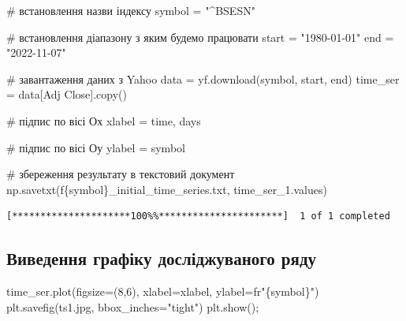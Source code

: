 \documentclass[
  letterpaper,
]{report}
\newenvironment{Shaded}{\begin{snugshade}}{\end{snugshade}}
\newcommand{\CommentTok}[1]{\textcolor[rgb]{0.37,0.37,0.37}{#1}}
\newcommand{\DecValTok}[1]{\textcolor[rgb]{0.68,0.00,0.00}{#1}}
\newcommand{\NormalTok}[1]{\textcolor[rgb]{0.00,0.23,0.31}{#1}}
\newcommand{\OperatorTok}[1]{\textcolor[rgb]{0.37,0.37,0.37}{#1}}
\newcommand{\SpecialCharTok}[1]{\textcolor[rgb]{0.37,0.37,0.37}{#1}}
\newcommand{\SpecialStringTok}[1]{\textcolor[rgb]{0.13,0.47,0.30}{#1}}
\newcommand{\StringTok}[1]{\textcolor[rgb]{0.13,0.47,0.30}{#1}}
\newcommand{\VerbatimStringTok}[1]{\textcolor[rgb]{0.13,0.47,0.30}{#1}}
\begin{document}
\begin{Shaded}
\begin{Highlighting}[]
\CommentTok{\# встановлення назви індексу}
\NormalTok{symbol }\OperatorTok{=} \StringTok{"\^{}BSESN"} 

\CommentTok{\# встановлення діапазону з яким будемо працювати}
\NormalTok{start }\OperatorTok{=} \StringTok{"1980{-}01{-}01"}
\NormalTok{end }\OperatorTok{=} \StringTok{"2022{-}11{-}07"}

\CommentTok{\# завантаження даних з Yahoo}
\NormalTok{data }\OperatorTok{=}\NormalTok{ yf.download(symbol, start, end)}
\NormalTok{time\_ser }\OperatorTok{=}\NormalTok{ data[}\StringTok{\textquotesingle{}Adj Close\textquotesingle{}}\NormalTok{].copy()}

\CommentTok{\# підпис по вісі Ох }
\NormalTok{xlabel }\OperatorTok{=} \StringTok{\textquotesingle{}time, days\textquotesingle{}}

\CommentTok{\# підпис по вісі Оу}
\NormalTok{ylabel }\OperatorTok{=}\NormalTok{ symbol                       }

\CommentTok{\# збереження результату в текстовий документ }
\NormalTok{np.savetxt(}\SpecialStringTok{f\textquotesingle{}}\SpecialCharTok{\{}\NormalTok{symbol}\SpecialCharTok{\}}\SpecialStringTok{\_initial\_time\_series.txt\textquotesingle{}}\NormalTok{, time\_ser\_1.values)}
\end{Highlighting}
\end{Shaded}

\begin{verbatim}
[*********************100%%**********************]  1 of 1 completed
\end{verbatim}

\hypertarget{ux432ux438ux432ux435ux434ux435ux43dux43dux44f-ux433ux440ux430ux444ux456ux43aux443-ux434ux43eux441ux43bux456ux434ux436ux443ux432ux430ux43dux43eux433ux43e-ux440ux44fux434ux443-1}{%
\subsection{Виведення графіку досліджуваного
ряду}\label{ux432ux438ux432ux435ux434ux435ux43dux43dux44f-ux433ux440ux430ux444ux456ux43aux443-ux434ux43eux441ux43bux456ux434ux436ux443ux432ux430ux43dux43eux433ux43e-ux440ux44fux434ux443-1}}

\begin{Shaded}
\begin{Highlighting}[]
\NormalTok{time\_ser.plot(figsize}\OperatorTok{=}\NormalTok{(}\DecValTok{8}\NormalTok{,}\DecValTok{6}\NormalTok{), xlabel}\OperatorTok{=}\NormalTok{xlabel, ylabel}\OperatorTok{=}\VerbatimStringTok{fr"}\SpecialCharTok{\{}\NormalTok{symbol}\SpecialCharTok{\}}\VerbatimStringTok{"}\NormalTok{)}
\NormalTok{plt.savefig(}\StringTok{\textquotesingle{}ts1.jpg\textquotesingle{}}\NormalTok{, bbox\_inches}\OperatorTok{=}\StringTok{"tight"}\NormalTok{)}
\NormalTok{plt.show()}\OperatorTok{;}
\end{Highlighting}
\end{Shaded}
\end{document}
